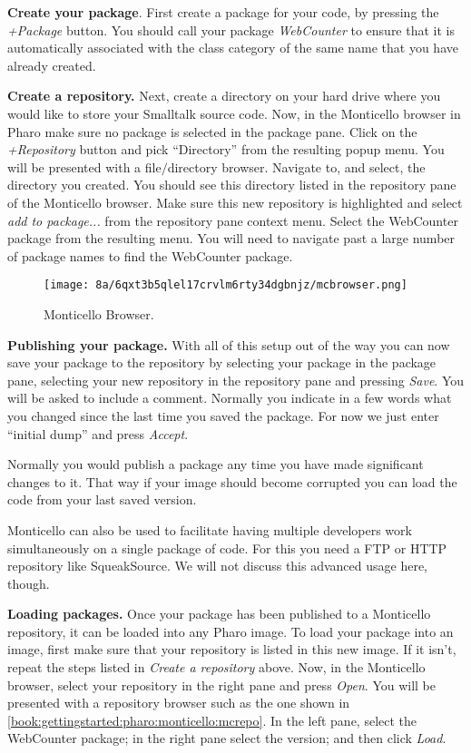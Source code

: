 \documentclass[a4paper,10pt,twoside]{book}
\newcommand{\ct}[1]{{\small\ttfamily\textup{#1}}}
\begin{document}
\textbf{Create your package}. First create a package for your code, by pressing the \textit{+Package} button. You should call your package \textit{WebCounter} to ensure that it is automatically associated with the class category of the same name that you have already created.

\textbf{Create a repository.} Next, create a directory on your hard drive where you would like to store your Smalltalk source code. Now, in the Monticello browser in Pharo make sure no package is selected in the package pane. Click on the \textit{+Repository} button and pick ``Directory'' from the resulting popup menu. You will be presented with a file$/$directory browser. Navigate to, and select, the directory you created. You should see this directory listed in the repository pane of the Monticello browser. Make sure this new repository is highlighted and select \textit{add to package...} from the repository pane context menu. Select the \ct{WebCounter} package from the resulting menu. You will need to navigate past a large number of package names to find the \ct{WebCounter} package.

\begin{figure}[h!tbp]
	\begin{center}
		\texttt{[image: 8a/6qxt3b5qlel17crvlm6rty34dgbnjz/mcbrowser.png]}
		\caption{Monticello Browser.\label{book:gettingstarted:pharo:monticello:mcbrowser}}
	\end{center}
\end{figure}


\textbf{Publishing your package.} With all of this setup out of the way you can now save your package to the repository by selecting your package in the package pane, selecting your new repository in the repository pane and pressing \textit{Save}. You will be asked to include a comment. Normally you indicate in a few words what you changed since the last time you saved the package. For now we just enter ``initial dump'' and press \textit{Accept}.

Normally you would publish a package any time you have made significant changes to it. That way if your image should become corrupted you can load the code from your last saved version.

Monticello can also be used to facilitate having multiple developers work simultaneously on a single package of code. For this you need a FTP or HTTP repository like SqueakSource. We will not discuss this advanced usage here, though.

\textbf{Loading packages.} Once your package has been published to a Monticello repository, it can be loaded into any Pharo image. To load your package into an image, first make sure that your repository is listed in this new image. If it isn't, repeat the steps listed in \textit{Create a repository} above. Now, in the Monticello browser, select your repository in the right pane and press \textit{Open}. You will be presented with a repository browser such as the one shown in \autoref{book:gettingstarted:pharo:monticello:mcrepo}. In the left pane, select the WebCounter package; in the right pane select the version; and then click \textit{Load}.
\end{document}
